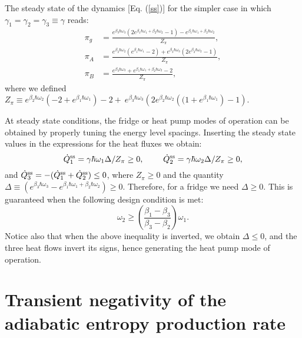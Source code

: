 \documentclass[aps,prx,twocolumn,showpacs,floatfix,superscriptaddress,graphics,longbibliography]{revtex4-1}
\begin{document}
The steady state of the dynamics [Eq. (\ref{ss})] for the simpler case in which $\gamma_1 = \gamma_2 = \gamma_3 \equiv \gamma$ reads:
\begin{align}
\pi_g &= \frac{ e^{\beta_3 \hbar \omega_3}\left( 2 e^{\beta_1 \hbar \omega_1 + \beta_2 \hbar \omega_2} -1 \right) - e^{\beta_1 \hbar \omega_1 + \beta_2 \hbar \omega_2} }{Z_\pi},   \\
\pi_{A} &= \frac{ e^{\beta_2 \hbar \omega_2}\left( e^{\beta_1 \hbar \omega_1} - 2 \right) + e^{\beta_3 \hbar \omega_3}\left( 2 e^{\beta_2 \hbar \omega_2} - 1 \right) }{Z_\pi},   \\
\pi_{B} &= \frac{ e^{\beta_3 \hbar \omega_3} + e^{\beta_1 \hbar \omega_1 + \beta_2 \hbar \omega_2} - 2 }{Z_\pi},
\end{align}
where we defined $Z_\pi \equiv e^{\beta_2 \hbar \omega_2} \left(-2 + e^{\beta_1 \hbar \omega_1} \right)- 2   + ~ e^{\beta_3 \hbar \omega_3} \left(2 e^{\beta_2 \hbar \omega_2}\left((1 + e^{\beta_1 \hbar \omega_1}\right) - 1 \right)$.

At steady state conditions, the fridge or heat pump modes of operation can be obtained by properly tuning the energy level spacings. Inserting the steady state values in the expressions for the heat 
fluxes we obtain:
\begin{equation}\label{ssflows}
\dot{Q}_1^{\rm ss} = \gamma \hbar \omega_1 \Delta/Z_\pi \geq 0, ~~~~~~~  \dot{Q}_2^{\rm ss} = \gamma \hbar \omega_2 \Delta/Z_\pi \geq 0, 
\end{equation}
and $\dot{Q}_3^{\rm ss} = - (\dot{Q}_1^{\rm ss} + \dot{Q}_2^{\rm ss}) \leq 0$, where $Z_\pi \geq 0$ and the quantity $\Delta \equiv \left( e^{\beta_3 \hbar \omega_3} - e^{\beta_1 \hbar \omega_1 + \beta_2 \hbar \omega_2}\right) \geq0$. 
Therefore, for a fridge we need $\Delta \geq 0$. This is guaranteed when the following design condition is met: 
\begin{equation}\label{cooling-window}
 \omega_2 \geq \left( \frac{\beta_1 - \beta_3}{\beta_3 - \beta_2} \right) \omega_1.
\end{equation}
Notice also that when the above inequality is inverted, we obtain $\Delta \leq 0$, and the three heat flows invert its signs, hence generating the heat pump mode of operation.



\section{Transient negativity of the adiabatic entropy production rate} \label{appE}
\end{document}
